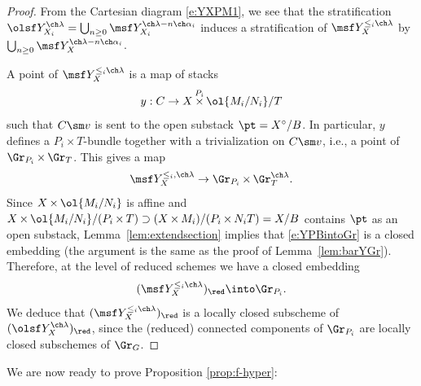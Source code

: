 \documentclass[final]{amsart}
\theoremstyle{remark}
\theoremstyle{definition}
\DeclareMathOperator*{\xt}{\times}
\numberwithin{equation}{section}
\begin{document}
\begin{proof}
From the Cartesian diagram \eqref{e:YXPM1}, we see that 
the stratification 
$\olsf Y^{\ch\lambda}_{X_i} = \bigcup_{n\ge 0} \msf Y^{\ch\lambda-n\ch\alpha_i}_{X_i}$ 
induces a stratification 
of $\msf Y^{\le_i \ch\lambda}_{X}$ by 
$\bigcup_{n\ge 0}\msf Y^{\ch\lambda-n\ch\alpha_i}_X$.

A point of $\msf Y^{\le_i\ch\lambda}_{X}$ is a map of stacks
\[
    y: C \to X \xt^{P_i} \ol{M_i/N_i} / T 
\]
such that $C\sm v$ is sent to the open substack $\pt = X^\circ/B$. 
In particular, $y$ defines a $P_i \xt T$-bundle together with a trivialization on $C\sm v$, i.e.,
a point of $\Gr_{P_i} \xt \Gr_T$. 
This gives a map 
\begin{equation} \label{e:YPBintoGr}
    \msf Y^{\le_i,\ch\lambda}_{X} \to \Gr_{P_i} \xt \Gr_T^{\ch\lambda}. 
\end{equation}
Since $X \xt \ol{M_i/N_i}$ is affine and $X \xt \ol{M_i/N_i} / (P_i \xt T) \supset 
(X \xt M_i)/ (P_i\xt N_i T) = X/B$ 
contains $\pt$ as an open substack, Lemma~\ref{lem:extendsection} 
implies that \eqref{e:YPBintoGr} is a closed embedding (the argument is
the same as the proof of Lemma~\ref{lem:barYGr}).
Therefore, at the level of reduced schemes we have 
a closed embedding 
\[ (\msf Y^{\le_i\ch\lambda}_{X})_\red \into \Gr_{P_i}. \]
We deduce that $(\msf Y^{\le_i \ch\lambda}_{X})_\red$ is a locally closed 
subscheme of $(\olsf Y^{\ch\lambda}_X)_\red$, since the (reduced) connected components of 
$\Gr_{P_i}$ are locally closed subschemes of $\Gr_G$.
\end{proof}

We are now ready to prove Proposition \ref{prop:f-hyper}:
\end{document}

